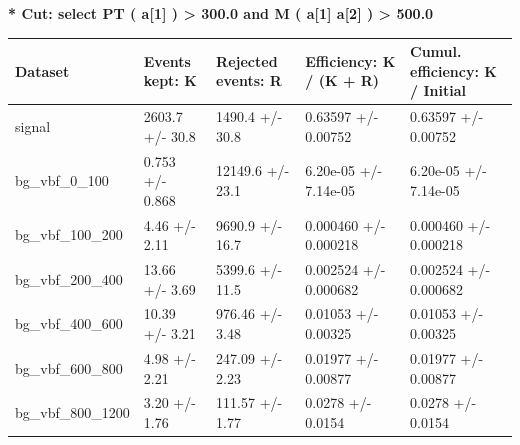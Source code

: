 \documentclass[a4paper, 10pt]{article}
\begin{document}
\textbf{* Cut: select PT ( a[1] ) > 300.0 and M ( a[1] a[2] ) > 500.0}\\
   \begin{table}[H]
  \begin{center}
    \begin{tabular}{|m{20.0mm}|m{27.0mm}|m{27.0mm}|m{33.0mm}|m{32.0mm}|}
      \hline
      {\cellcolor{yellow}         Dataset}& {\cellcolor{yellow}         Events kept:
          K}& {\cellcolor{yellow}         Rejected events:
          R}& {\cellcolor{yellow}         Efficiency:
          K /\- (K + R)}& {\cellcolor{yellow}         Cumul. efficiency:
          K /\- Initial}\\
      \hline
      {\cellcolor{white}         signal}& {\cellcolor{white}         2603.7 +/\-- 30.8}& {\cellcolor{white}         1490.4 +/\-- 30.8}& {\cellcolor{white}         0.63597 +/\-- 0.00752}& {\cellcolor{white}         0.63597 +/\-- 0.00752}\\
      \hline
      {\cellcolor{white}         bg\_vbf\_0\_100}& {\cellcolor{white}         0.753 +/\-- 0.868}& {\cellcolor{white}         12149.6 +/\-- 23.1}& {\cellcolor{white}         6.20e-05 +/\-- 7.14e-05}& {\cellcolor{white}         6.20e-05 +/\-- 7.14e-05}\\
      \hline
      {\cellcolor{white}         bg\_vbf\_100\_200}& {\cellcolor{white}         4.46 +/\-- 2.11}& {\cellcolor{white}         9690.9 +/\-- 16.7}& {\cellcolor{white}         0.000460 +/\-- 0.000218}& {\cellcolor{white}         0.000460 +/\-- 0.000218}\\
      \hline
      {\cellcolor{white}         bg\_vbf\_200\_400}& {\cellcolor{white}         13.66 +/\-- 3.69}& {\cellcolor{white}         5399.6 +/\-- 11.5}& {\cellcolor{white}         0.002524 +/\-- 0.000682}& {\cellcolor{white}         0.002524 +/\-- 0.000682}\\
      \hline
      {\cellcolor{white}         bg\_vbf\_400\_600}& {\cellcolor{white}         10.39 +/\-- 3.21}& {\cellcolor{white}         976.46 +/\-- 3.48}& {\cellcolor{white}         0.01053 +/\-- 0.00325}& {\cellcolor{white}         0.01053 +/\-- 0.00325}\\
      \hline
      {\cellcolor{white}         bg\_vbf\_600\_800}& {\cellcolor{white}         4.98 +/\-- 2.21}& {\cellcolor{white}         247.09 +/\-- 2.23}& {\cellcolor{white}         0.01977 +/\-- 0.00877}& {\cellcolor{white}         0.01977 +/\-- 0.00877}\\
      \hline
      {\cellcolor{white}         bg\_vbf\_800\_1200}& {\cellcolor{white}         3.20 +/\-- 1.76}& {\cellcolor{white}         111.57 +/\-- 1.77}& {\cellcolor{white}         0.0278 +/\-- 0.0154}& {\cellcolor{white}         0.0278 +/\-- 0.0154}\\

\end{tabular}
\end{center}
\end{table}
\end{document}
